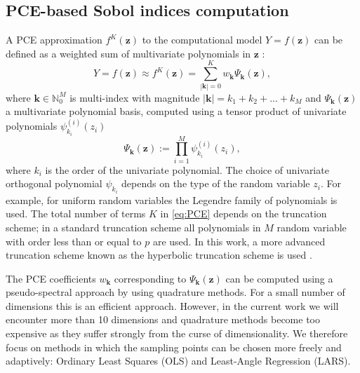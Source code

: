 \subsection{PCE-based Sobol indices computation}
A PCE approximation $f^{K}(\mathbf{z})$ to the computational model $Y=f(\mathbf{z})$ can be defined as a weighted sum of multivariate polynomials in $\mathbf{z}$ \cite{RSmith}:
\begin{equation}\label{eq:PCE}
Y= f(\mathbf{z}) \approx f^{K}(\mathbf{z}) = \sum_{|\mathbf{k}| = 0}^K w_{\mathbf{k}}\Psi_{\mathbf{k}}(\mathbf{z}),
\end{equation}
where $\mathbf{k}\in \mathbb{N}_0^M$ is multi-index with magnitude $|\mathbf{k}| = k_1+k_2 + ... + k_M$ and $\Psi_{\mathbf{k}}(\mathbf{z})$ a multivariate polynomial basis, computed using a tensor product of univariate polynomials $\psi_{k_i}^{(i)}(z_i)$
\begin{equation}
\Psi_{\mathbf{k}}(\mathbf{z}) := \prod_{i=1}^M\psi_{k_i}^{(i)}(z_i),
\end{equation}
where $k_i$ is the order of the univariate polynomial. The choice of univariate orthogonal polynomial $\psi_{k_i}$ depends on the type of the random variable $z_i$. For example, for uniform random variables the Legendre family of polynomials is used. 
The total number of terms $K$ in \eqref{eq:PCE} depends on the truncation scheme; in a standard truncation scheme  all polynomials in $M$ random variable with order less than or equal to $p$ are used. In this work, a more advanced truncation scheme known as the hyperbolic truncation scheme is used \cite{BlatmanThesis}. 

The PCE coefficients $w_{\mathbf{k}}$ corresponding to $\Psi_{\mathbf{k}}(\mathbf{z})$ can be computed using a pseudo-spectral approach by using quadrature methods. For a small number of dimensions this is an efficient approach. However, in the current work we will encounter more than 10 dimensions and quadrature methods become  too expensive as they suffer strongly from the curse of dimensionality. We therefore focus on methods in which the sampling points can be chosen more freely and adaptively: Ordinary Least Squares (OLS) and Least-Angle Regression (LARS).

